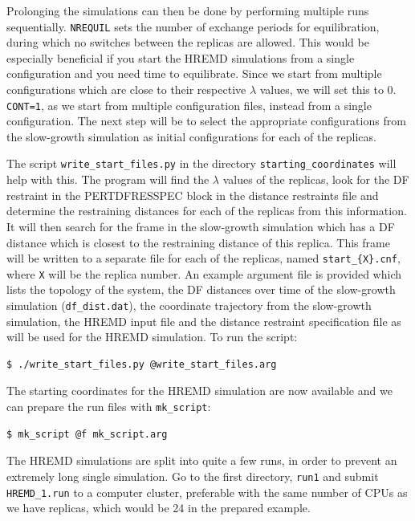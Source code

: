 Prolonging the simulations can then be done by performing multiple runs sequentially. 
\texttt{NREQUIL} sets the number of exchange periods for equilibration, during which no switches between the replicas are allowed. 
This would be especially beneficial if you start the HREMD simulations from a single configuration and you need time to equilibrate. 
Since we start from multiple configurations which are close to their respective $\lambda$ values, we will set this to 0. 
\texttt{CONT=1}, as we start from multiple configuration files, instead from a single configuration.
The next step will be to select the appropriate configurations from the slow-growth simulation as initial configurations for each of the replicas.

The script \texttt{write\_start\_files.py} in the directory \texttt{starting\_coordinates} will help with this. 
The program will find the $\lambda$ values of the replicas, look for the DF restraint in the PERTDFRESSPEC block in the distance restraints file and determine the restraining distances for each of the replicas from this information.
It will then search for the frame in the slow-growth simulation which has a DF distance which is closest to the restraining distance of this replica.
This frame will be written to a separate file for each of the replicas, named \texttt{start\_\{X\}.cnf}, where \texttt{X} will be the replica number. 
An example argument file is provided which lists the topology of the system, the DF distances over time of the slow-growth simulation (\texttt{df\_dist.dat}), the coordinate trajectory from the slow-growth simulation, the HREMD input file and the distance restraint specification file as will be used for the HREMD simulation. To run the script:
\begin{lstlisting}
$ ./write_start_files.py @write_start_files.arg 
\end{lstlisting}
The starting coordinates for the HREMD simulation are now available and we can prepare the run files with \texttt{mk\_script}:
\begin{lstlisting}
$ mk_script @f mk_script.arg
\end{lstlisting}
The HREMD simulations are split into quite a few runs, in order to prevent an extremely long single simulation. 
Go to the first directory, \texttt{run1} and submit \texttt{HREMD\_1.run} to a computer cluster, preferable with the same number of CPUs as we have replicas, which would be 24 in the prepared example. 

